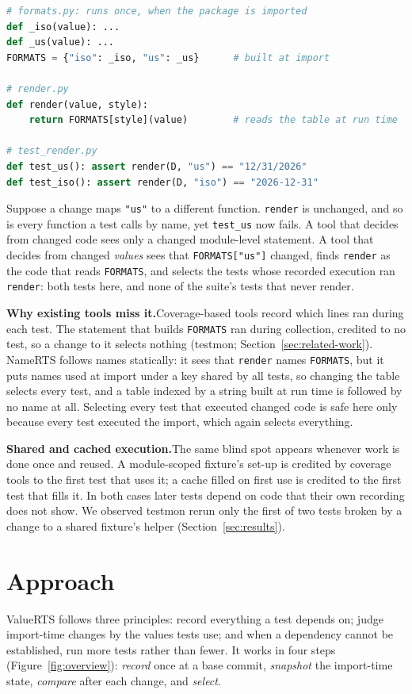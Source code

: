 \documentclass[acmsmall,screen,review,anonymous]{acmart}
\newcommand{\tool}{ValueRTS\xspace}
\newcommand{\para}[1]{\smallskip\noindent\textbf{#1}\hspace{0.4em}}
\begin{document}
\begin{lstlisting}[language=Python]
# formats.py: runs once, when the package is imported
def _iso(value): ...
def _us(value): ...
FORMATS = {"iso": _iso, "us": _us}      # built at import

# render.py
def render(value, style):
    return FORMATS[style](value)        # reads the table at run time

# test_render.py
def test_us(): assert render(D, "us") == "12/31/2026"
def test_iso(): assert render(D, "iso") == "2026-12-31"
\end{lstlisting}

Suppose a change maps \texttt{"us"} to a different function. \texttt{render} is unchanged, and so is every function a test calls by name, yet \texttt{test\_us} now fails. A tool that decides from changed code sees only a changed module-level statement. A tool that decides from changed \emph{values} sees that \texttt{FORMATS["us"]} changed, finds \texttt{render} as the code that reads \texttt{FORMATS}, and selects the tests whose recorded execution ran \texttt{render}: both tests here, and none of the suite's tests that never render.

\para{Why existing tools miss it.}Coverage-based tools record which lines ran during each test. The statement that builds \texttt{FORMATS} ran during collection, credited to no test, so a change to it selects nothing (testmon; Section~\ref{sec:related-work}). NameRTS follows names statically: it sees that \texttt{render} names \texttt{FORMATS}, but it puts names used at import under a key shared by all tests, so changing the table selects every test, and a table indexed by a string built at run time is followed by no name at all. Selecting every test that executed changed code is safe here only because every test executed the import, which again selects everything.

\para{Shared and cached execution.}The same blind spot appears whenever work is done once and reused. A module-scoped fixture's set-up is credited by coverage tools to the first test that uses it; a cache filled on first use is credited to the first test that fills it. In both cases later tests depend on code that their own recording does not show. We observed testmon rerun only the first of two tests broken by a change to a shared fixture's helper (Section~\ref{sec:results}).


\section{Approach}\label{sec:approach}
\tool follows three principles: record everything a test depends on; judge import-time changes by the values tests use; and when a dependency cannot be established, run more tests rather than fewer. It works in four steps (Figure~\ref{fig:overview}): \emph{record} once at a base commit, \emph{snapshot} the import-time state, \emph{compare} after each change, and \emph{select}.
\end{document}
